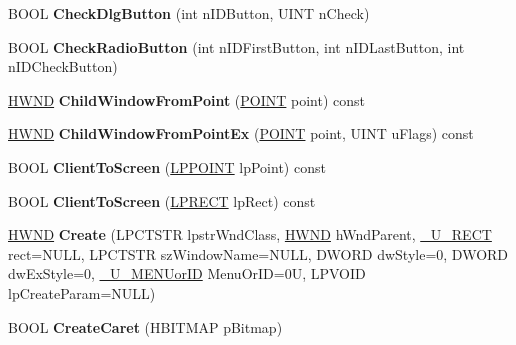 \begin{DoxyCompactItemize}
B\+O\+OL {\bfseries Check\+Dlg\+Button} (int n\+I\+D\+Button, U\+I\+NT n\+Check)
\item 
\mbox{\label{class_a_t_l_1_1_c_window_a404a7ad466b8edbf8efa0f8bd114dba6}} 
B\+O\+OL {\bfseries Check\+Radio\+Button} (int n\+I\+D\+First\+Button, int n\+I\+D\+Last\+Button, int n\+I\+D\+Check\+Button)
\item 
\mbox{\label{class_a_t_l_1_1_c_window_a3e983a61a39e24687a864caa3a21b124}} 
\hyperlink{interfacevoid}{H\+W\+ND} {\bfseries Child\+Window\+From\+Point} (\hyperlink{structtag_p_o_i_n_t}{P\+O\+I\+NT} point) const
\item 
\mbox{\label{class_a_t_l_1_1_c_window_a3fbe016f3325eb8dccd32cbc1879a120}} 
\hyperlink{interfacevoid}{H\+W\+ND} {\bfseries Child\+Window\+From\+Point\+Ex} (\hyperlink{structtag_p_o_i_n_t}{P\+O\+I\+NT} point, U\+I\+NT u\+Flags) const
\item 
\mbox{\label{class_a_t_l_1_1_c_window_aab86ecf2a5820bff5902add7f271febe}} 
B\+O\+OL {\bfseries Client\+To\+Screen} (\hyperlink{structtag_p_o_i_n_t}{L\+P\+P\+O\+I\+NT} lp\+Point) const
\item 
\mbox{\label{class_a_t_l_1_1_c_window_a97ab8b90222bc2ddde9f902d89ab0bf7}} 
B\+O\+OL {\bfseries Client\+To\+Screen} (\hyperlink{structtag_r_e_c_t}{L\+P\+R\+E\+CT} lp\+Rect) const
\item 
\mbox{\label{class_a_t_l_1_1_c_window_a376a6cd85ece8d2268feb3893ba5358e}} 
\hyperlink{interfacevoid}{H\+W\+ND} {\bfseries Create} (L\+P\+C\+T\+S\+TR lpstr\+Wnd\+Class, \hyperlink{interfacevoid}{H\+W\+ND} h\+Wnd\+Parent, \hyperlink{class_a_t_l_1_1___u___r_e_c_t}{\+\_\+\+U\+\_\+\+R\+E\+CT} rect=N\+U\+LL, L\+P\+C\+T\+S\+TR sz\+Window\+Name=N\+U\+LL, D\+W\+O\+RD dw\+Style=0, D\+W\+O\+RD dw\+Ex\+Style=0, \hyperlink{class_a_t_l_1_1___u___m_e_n_uor_i_d}{\+\_\+\+U\+\_\+\+M\+E\+N\+Uor\+ID} Menu\+Or\+ID=0\+U, L\+P\+V\+O\+I\+D lp\+Create\+Param=\+N\+U\+L\+L)
\item 
\mbox{\label{class_a_t_l_1_1_c_window_a0a86df990e103d5e65735a32aae1c891}} 
B\+O\+OL {\bfseries Create\+Caret} (H\+B\+I\+T\+M\+AP p\+Bitmap)

\end{DoxyCompactItemize}

